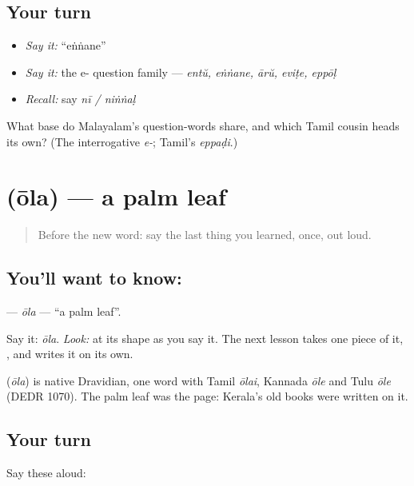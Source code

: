 \subsection*{Your turn}
\begin{itemize}
\raggedright
  \item \emph{Say it:} \textquotedblleft{}eṅṅane\textquotedblright{}
  \item \emph{Say it:} the e- question family — \emph{entŭ, eṅṅane, ārŭ, eviṭe, eppōḷ}
  \item \emph{Recall:} say \emph{nī / niṅṅaḷ}
\end{itemize}

\begin{tcolorbox}[breakable,colback=teal!4,colframe=teal!35!black,title={Before you move on}]
What base do Malayalam's question-words share, and which Tamil cousin heads its own? (The interrogative \emph{e-}; Tamil's \emph{eppaḍi}.)
\end{tcolorbox}
\section[\texorpdfstring{\ml{ഓല} (ōla)}{ഓല (ōla)}]{ (ōla) — a palm leaf}

\label{lesson:ML-C03-ola}



\begin{quote}
Before the new word: say the last thing you learned, once, out loud.
\end{quote}

\subsection*{You'll want to know: }
\textbf{} — \emph{ōla} — \textquotedblleft{}a palm leaf\textquotedblright{}.

Say it: \emph{ōla}. \emph{Look:} at its shape as you say it. The next lesson takes one piece of it, \textbf{}, and writes it on its own.

\begin{cousinweb}
\textbf{} (\emph{ōla}) is native Dravidian, one word with Tamil \emph{ōlai}, Kannada \emph{ōle} and Tulu \emph{ōle} (DEDR 1070). The palm leaf was the page: Kerala's old books were written on it.
\end{cousinweb}

\subsection*{Your turn}
Say these aloud:

